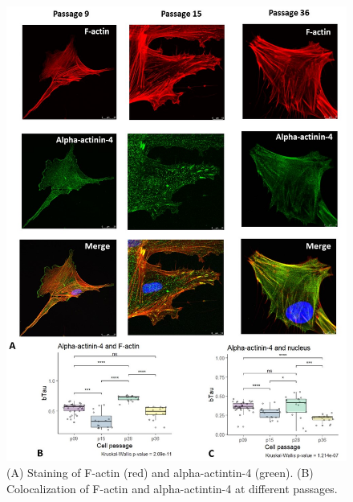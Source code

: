\documentclass[alpha-refs]{wiley-article}
\begin{document}
\begin{figure}[hbt!]
\centering
\includegraphics[width=0.9\linewidth]{alpha-actinin-4.jpg}
\caption{(A) Staining of F-actin (red) and alpha-actintin-4 (green).
(B) Colocalization of F-actin and alpha-actintin-4 at different passages.}
\end{figure}
\end{document}
